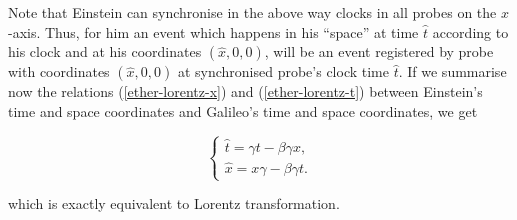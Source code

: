 \documentclass[main.tex]{subfiles}
\begin{document}
Note that Einstein can synchronise in the above way clocks in all probes on the $x$-axis. Thus, for him an event which happens in his ``space'' at time $\hat{t}$ according to his clock and at his coordinates $(\hat{x}, 0, 0)$, will be an event registered by probe with coordinates $(\hat{x}, 0, 0)$ at synchronised probe's clock time $\hat{t}$. If we summarise now the relations (\ref{ether-lorentz-x}) and (\ref{ether-lorentz-t}) between Einstein's time and space coordinates and Galileo's time and space coordinates, we get

\begin{equation}
\begin{cases}
\hat{t} = \gamma t - \beta \gamma x, \\
\hat{x} = x\gamma - \beta \gamma t. 
\end{cases}
\end{equation}

which is exactly equivalent to Lorentz transformation.
 
\end{document}
